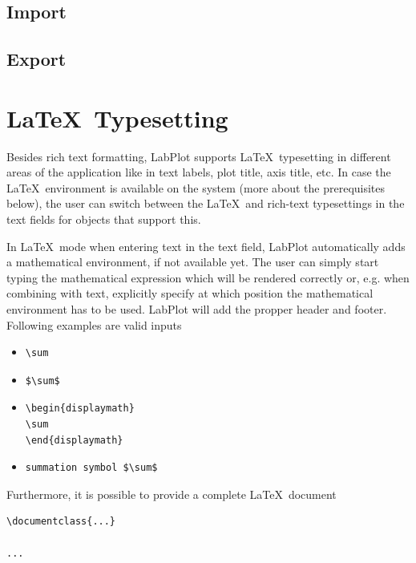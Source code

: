 \section{Import}\label{sec:import}
\section{Export}\label{sec:export}

\chapter{\LaTeX\, Typesetting}\label{ch:latex_typesetting}
Besides rich text formatting, LabPlot supports \LaTeX\, typesetting in different areas of the application like in text labels, plot title, axis title, etc. In case the \LaTeX\, environment is available on the system (more about the prerequisites below), the user can switch between the \LaTeX\, and rich-text typesettings in the text fields for objects that support this.

In \LaTeX\, mode when entering text in the text field, LabPlot automatically adds a mathematical environment, if not available yet. The user can simply start typing the mathematical expression which will be rendered correctly or, e.g. when combining with text, explicitly specify at which position the mathematical environment has to be used. LabPlot will add the propper header and footer. Following examples are valid inputs
\begin{itemize}
\item {
\begin{lstlisting}
\sum
\end{lstlisting}
}
%
\item {
\begin{lstlisting}
$\sum$
\end{lstlisting}
}
%
\item {
\begin{lstlisting}
\begin{displaymath}
\sum
\end{displaymath}
\end{lstlisting}
}
%
\item {
\begin{lstlisting}
summation symbol $\sum$
\end{lstlisting}
}
\end{itemize}
Furthermore, it is possible to provide a complete \LaTeX\, document
\begin{lstlisting}[language={[Latex]TeX}, backgroundcolor=\color{lightgray}, frame=single]
\documentclass{...}

...

\end{lstlisting}

